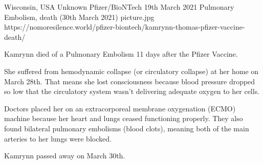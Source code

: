 {Wisconsin, USA}
{Unknown}
{Pfizer/BioNTech}
{19th March 2021}
{Pulmonary Embolism, death (30th March 2021)}
{picture.jpg}
{https://nomoresilence.world/pfizer-biontech/kamrynn-thomas-pfizer-vaccine-death/}
{

Kamrynn died of a Pulmonary Embolism 11 days after the Pfizer Vaccine.

She suffered from hemodynamic collapse (or circulatory collapse) at her home on
March 28th. That means she lost consciousness because blood pressure dropped so
low that the circulatory system wasn’t delivering adequate oxygen to her cells.

Doctors placed her on an extracorporeal membrane oxygenation (ECMO) machine
because her heart and lungs ceased functioning properly. They also found
bilateral pulmonary embolisms (blood clots), meaning both of the main arteries
to her lungs were blocked.

Kamrynn passed away on March 30th.

}
